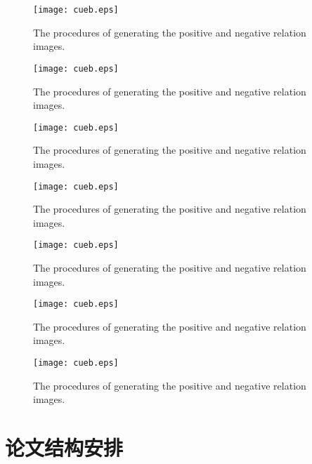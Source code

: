 \begin{figure}[ht]
\centering
\texttt{[image: cueb.eps]}
\caption{The procedures of generating the positive and negative relation images.}
\label{smi}
\end{figure}

\begin{figure}[ht]
\centering
\texttt{[image: cueb.eps]}
\caption{The procedures of generating the positive and negative relation images.}
\label{smi}
\end{figure}

\begin{figure}[ht]
\centering
\texttt{[image: cueb.eps]}
\caption{The procedures of generating the positive and negative relation images.}
\label{smi}
\end{figure}

\begin{figure}[ht]
\centering
\texttt{[image: cueb.eps]}
\caption{The procedures of generating the positive and negative relation images.}
\label{smi}
\end{figure}


\begin{figure}[ht]
\centering
\texttt{[image: cueb.eps]}
\caption{The procedures of generating the positive and negative relation images.}
\label{smi}
\end{figure}

\begin{figure}[ht]
\centering
\texttt{[image: cueb.eps]}
\caption{The procedures of generating the positive and negative relation images.}
\label{smi}
\end{figure}

\begin{figure}[ht]
\centering
\texttt{[image: cueb.eps]}
\caption{The procedures of generating the positive and negative relation images.}
\label{smi}
\end{figure}

\section{论文结构安排}
